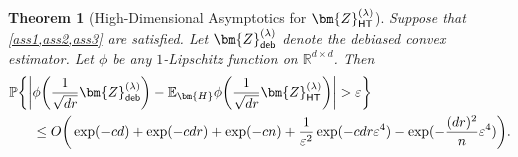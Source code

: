 \documentclass[10pt]{article}
\newcommand{\eps}{\ensuremath{\varepsilon}}
\newcommand{\p}{\mathbb{P}}
\newtheorem{theorem}{Theorem}
\theoremstyle{definition}
\begin{document}
\begin{theorem}[High-Dimensional Asymptotics for $\bm{Z}^{(\lambda)}_{{\sf HT}}$]\label{thm:zdeb} Suppose that \cref{ass1,ass2,ass3} are satisfied.
Let $\bm{Z}^{(\lambda)}_{{\sf deb}}$ denote the debiased convex estimator.  Let $\phi$ be any $1$-Lipschitz function on $\mathbb{R}^{d \times d}$.  Then
\begin{align}
    \p\bigg\{ \bigg|   &\phi\bigg( \frac{1}{\sqrt{dr}}\bm{ Z}^{(\lambda)}_{{\sf deb}} \bigg) - \mathbb{E}_{\bm{H}} \phi\bigg( \frac{1}{\sqrt{dr}}\bm{Z}^{(\lambda)}_{\sf HT} \bigg) \bigg| > \eps \bigg\} \\
    &\leq  O\bigg( \exp( - c d) +  \exp( - c dr) + \exp( - c n) + \frac{1}{\eps^2} \exp(-c dr \eps^4 ) - \exp( - \frac{(dr)^2}{n} \eps^4) \bigg).
\end{align}
\end{theorem}
\end{document}
